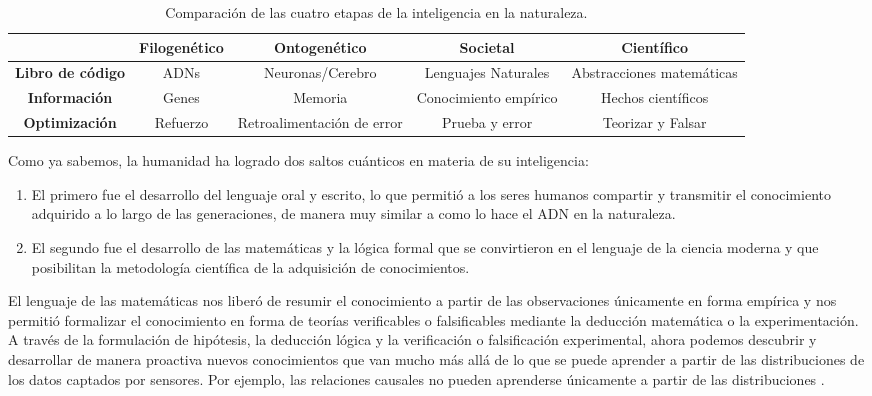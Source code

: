 \documentclass[../../book-main_es.tex]{subfiles}
\begin{document}
\begin{table}[h]
    \centering
    \resizebox{1\columnwidth}{!}
    {
        \begin{tabular}{| c | c | c | c | c |}
            \hline & \textbf{Filogenético} & \textbf{Ontogenético} &
            \textbf{Societal} & \textbf{Científico}\\
            \hline

            \textbf{Libro de código}  & ADNs & Neuronas/Cerebro & Lenguajes Naturales
            & Abstracciones matemáticas \\ [0.5ex]
            \hline

            \textbf{Información} & Genes & Memoria & Conocimiento
            empírico & Hechos científicos\\ [0.5ex]
            \hline
            \textbf{Optimización} & Refuerzo & Retroalimentación de error &
            Prueba y error & Teorizar y Falsar \\  [0.5ex]
            \hline
        \end{tabular}
    }
    \caption{Comparación de las cuatro etapas de la inteligencia en la naturaleza.}
    \label{tab:four-stage-intelligence}
\end{table}

Como ya sabemos, la humanidad ha logrado dos saltos cuánticos en materia de su inteligencia:
\begin{enumerate}
    \item El primero fue el desarrollo del lenguaje oral y escrito,
        lo que permitió a los seres humanos compartir y transmitir el conocimiento adquirido
        a lo largo de las generaciones, de manera muy similar a como lo hace el ADN en la naturaleza.
    \item El segundo fue el desarrollo de las matemáticas y la lógica formal
        que se convirtieron en el lenguaje de la ciencia moderna y que posibilitan la 
        metodología científica de la adquisición de conocimientos.
\end{enumerate}
El lenguaje de las matemáticas nos liberó de resumir el conocimiento a partir de
las observaciones únicamente en forma empírica y nos permitió formalizar
el conocimiento en forma de teorías verificables o falsificables mediante la deducción
matemática o la experimentación. A través de la formulación de hipótesis, la deducción
lógica y la verificación o falsificación experimental, ahora podemos
descubrir y desarrollar de manera proactiva nuevos conocimientos que van mucho más allá
de lo que se puede aprender a partir de las distribuciones de los datos
captados por sensores. Por ejemplo, las relaciones causales no pueden aprenderse
únicamente a partir de las distribuciones \citep{Pearl-2009}.
\end{document}
